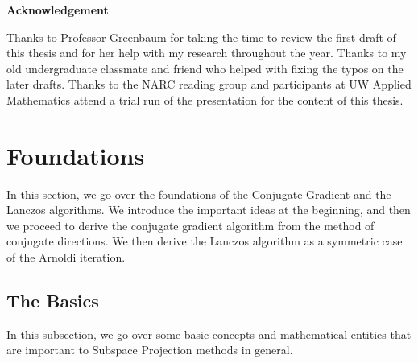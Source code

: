 \documentclass[]{article}
\theoremstyle{definition}
\begin{document}
\newpage
\begin{center}\large
    \textbf{Acknowledgement}
\end{center}

Thanks to Professor Greenbaum for taking the time to review the first draft of this thesis and for her help with my research throughout the year. Thanks to my old undergraduate classmate and friend who helped with fixing the typos on the later drafts. Thanks to the NARC reading group and participants at UW Applied Mathematics attend a trial run of the presentation for the content of this thesis. 



\newpage
\section{Foundations}
    In this section, we go over the foundations of the Conjugate Gradient and the Lanczos algorithms. We introduce the important ideas at the beginning, and then we proceed to derive the conjugate gradient algorithm from the method of conjugate directions.  We then derive the Lanczos algorithm as a symmetric case of the Arnoldi iteration. 
    \subsection{The Basics}
        In this subsection, we go over some basic concepts and mathematical entities that are important to Subspace Projection methods in general. 
\end{document}
